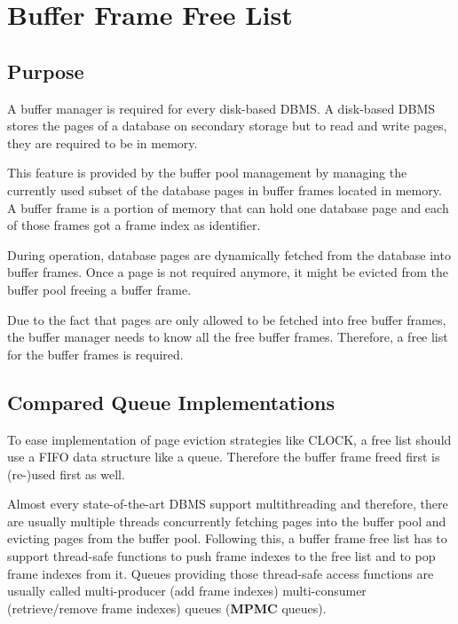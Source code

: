 \chapter[Buffer Frame Free List]{Buffer Frame Free List} \label{ch:free-list}

\section[Purpose]{Purpose}

	A buffer manager is required for every disk-based DBMS. A disk-based DBMS stores the pages of a database on secondary storage but to read and write pages, they are required to be in memory.
	
	This feature is provided by the buffer pool management by managing the currently used subset of the database pages in buffer frames located in memory. A buffer frame is a portion of memory that can hold one database page and each of those frames got a frame index as identifier.
	
	During operation, database pages are dynamically fetched from the database into buffer frames. Once a page is not required anymore, it might be evicted from the buffer pool freeing a buffer frame.
	
	Due to the fact that pages are only allowed to be fetched into free buffer frames, the buffer manager needs to know all the free buffer frames. Therefore, a free list for the buffer frames is required.

\section[Compared Queue Implementations]{Compared Queue Implementations}

	To ease implementation of page eviction strategies like CLOCK, a free list should use a FIFO data structure like a queue. Therefore the buffer frame freed first is (re-)used first as well.
	
	Almost every state-of-the-art DBMS support multithreading and therefore, there are usually multiple threads concurrently fetching pages into the buffer pool and evicting pages from the buffer pool. Following this, a buffer frame free list has to support thread-safe functions to push frame indexes to the free list and to pop frame indexes from it. Queues providing those thread-safe access functions are usually called multi-producer (add frame indexes) multi-consumer (retrieve/remove frame indexes) queues (\textbf{MPMC} queues).
	
